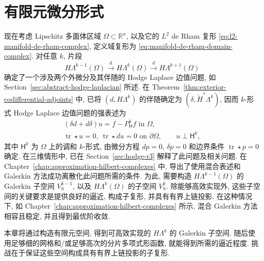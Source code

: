 \clearpage\setcounter{section}{6}
\section{{有限元微分形式}}\label{chap:finite-element-differential-forms}

{现在考虑 Lipschitz 多面体区域 $\Omega\subset\mathbb R^n$, 以及它的 $L^2$ de Rham 复形 \eqref{eq:l2-manifold-de-rham-complex}, 定义域复形为 \eqref{eq:manifold-de-rham-domain-complex}. 对任意 $k$, 片段}
\begin{equation}\label{eq:finite-element-forms-short-complex}
H\Lambda^{k-1}(\Omega)\xrightarrow{d}H\Lambda^k(\Omega)\xrightarrow{d}H\Lambda^{k+1}(\Omega)
\end{equation}
{确定了一个涉及两个外微分及其伴随的 Hodge Laplace 边值问题, 如 Section~\ref{sec:abstract-hodge-laplacian} 所述. 在 Theorem~\ref{thm:exterior-codifferential-adjoints} 中, 已将 $(d,H\Lambda^k)$ 的伴随确定为 $(\delta,\mathring H^*\Lambda^k)$, 因而 $k$-形式 Hodge Laplace 边值问题的强表述为}
\begin{equation}\label{eq:finite-element-forms-hodge-strong}
\begin{gathered}
(\delta d+d\delta)u=f-P_{\mathsf H}^kf\text{ in }\Omega,\\
\operatorname{tr}\star u=0,\ \operatorname{tr}\star du=0\text{ on }\partial\Omega,\qquad u\perp\mathsf H^k,
\end{gathered}
\end{equation}
{其中 $\mathsf H^k$ 为 $\Omega$ 上的调和 $k$-形式, 由微分方程 $dp=0$, $\delta p=0$ 和边界条件 $\operatorname{tr}\star p=0$ 确定. 在三维情形中, 已在 Section~\ref{sec:hodge-r3} 解释了此问题及相关问题. 在 Chapter~\ref{chap:approximation-hilbert-complexes} 中, 导出了使用混合表述和 Galerkin 方法成功离散化此问题所需的条件. 为此, 需要构造 $H\Lambda^{k-1}(\Omega)$ 的 Galerkin 子空间 $V_h^{k-1}$, 以及 $H\Lambda^k(\Omega)$ 的子空间 $V_h^k$. 除能够高效实现外, 这些子空间的关键要求是提供良好的逼近, 构成子复形, 并具有有界上链投影. 在这种情况下, 如 Chapter~\ref{chap:approximation-hilbert-complexes} 所示, 混合 Galerkin 方法相容且稳定, 并且得到最优阶收敛.}

{本章将通过构造有限元空间, 得到可高效实现的 $H\Lambda^k$ 的 Galerkin 子空间. 随后使用足够细的网格和/或足够高次的分片多项式形函数, 就能得到所需的逼近程度. 挑战在于保证这些空间构成具有有界上链投影的子复形.}

